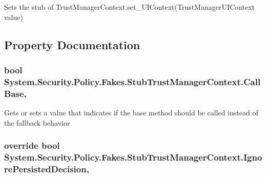 Sets the stub of Trust\-Manager\-Context.\-set\-\_\-\-U\-I\-Context(\-Trust\-Manager\-U\-I\-Context value)



\subsection{Property Documentation}
\hypertarget{class_system_1_1_security_1_1_policy_1_1_fakes_1_1_stub_trust_manager_context_a40c8c7d314047bbbad6ffbff2776b6d7}{
\subsubsection[{Call\-Base}]{\setlength{\rightskip}{0pt plus 5cm}bool System.\-Security.\-Policy.\-Fakes.\-Stub\-Trust\-Manager\-Context.\-Call\-Base\hspace{0.3cm}{\ttfamily [get]}, {\ttfamily [set]}}}\label{class_system_1_1_security_1_1_policy_1_1_fakes_1_1_stub_trust_manager_context_a40c8c7d314047bbbad6ffbff2776b6d7}


Gets or sets a value that indicates if the base method should be called instead of the fallback behavior

\hypertarget{class_system_1_1_security_1_1_policy_1_1_fakes_1_1_stub_trust_manager_context_ad1fba05befd34ff44bee0871e78f3e1c}{
\subsubsection[{Ignore\-Persisted\-Decision}]{\setlength{\rightskip}{0pt plus 5cm}override bool System.\-Security.\-Policy.\-Fakes.\-Stub\-Trust\-Manager\-Context.\-Ignore\-Persisted\-Decision\hspace{0.3cm}{\ttfamily [get]}, {\ttfamily [set]}}}\label{class_system_1_1_security_1_1_policy_1_1_fakes_1_1_stub_trust_manager_context_ad1fba05befd34ff44bee0871e78f3e1c}


